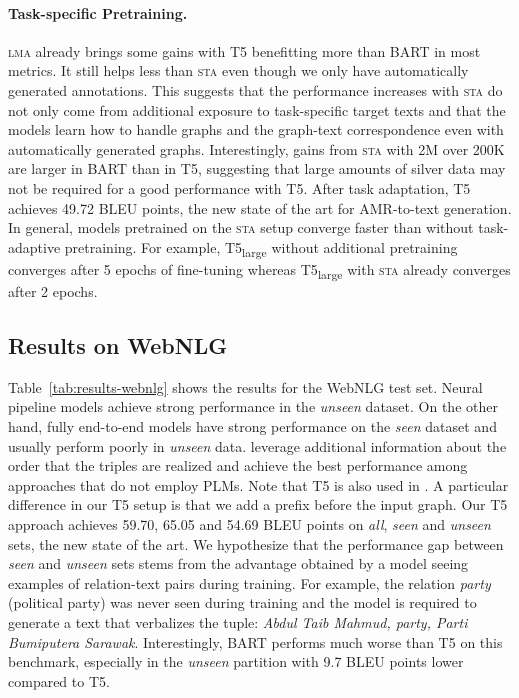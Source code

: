 \documentclass[11pt,a4paper]{article}
\begin{document}
\begin{table*}[t]
\paragraph{Task-specific Pretraining.}
\textsc{lma}
already brings some gains with T5 benefitting more than BART in most metrics.
It still helps less than \textsc{sta} even though we only have automatically generated annotations.
This suggests that the performance increases with \textsc{sta} do not only come from additional exposure to task-specific target texts and that the models learn how to handle graphs and the graph-text correspondence even with automatically generated graphs. Interestingly, gains from \textsc{sta} with 2M over 200K are larger in BART than in T5, suggesting that large amounts of silver data may not be required for a good performance with T5.
After task adaptation, T5 achieves 49.72 BLEU points, the new state of the art for AMR-to-text generation. In general, models pretrained on the \textsc{sta} setup converge faster than without task-adaptive pretraining. For example, T5\textsubscript{large} without additional pretraining converges after 5 epochs of fine-tuning whereas T5\textsubscript{large} with \textsc{sta} already converges after 2 epochs.



\subsection{Results on WebNLG}



Table~\ref{tab:results-webnlg} shows the results for the WebNLG test set. Neural pipeline models \cite{moryossef-etal-2019-step, castro-ferreira-etal-2019-neural} achieve strong performance in the \emph{unseen} dataset. On the other hand, fully end-to-end models \cite{ribeiro2020modeling,schmitt2020modeling} have strong performance on the \emph{seen} dataset and usually perform poorly in \textit{unseen} data. \citet{zhao-etal-2020-bridging} leverage additional information about the order that the triples are realized and achieve the best performance among approaches that do not employ PLMs. Note that T5 is also used in \citet{kale2020texttotext}. A particular difference in our T5 setup is that we add a prefix before the input graph. Our T5 approach achieves 59.70, 65.05 and 54.69 BLEU points on \emph{all}, \emph{seen} and \emph{unseen} sets, the new state of the art. We hypothesize that the performance gap between \emph{seen} and \emph{unseen} sets stems from the advantage obtained by a model seeing examples of relation-text pairs during training. For example, the relation \emph{party} (political party) was never seen during training and the model is required to generate a text that verbalizes the tuple: \emph{Abdul Taib Mahmud, party, Parti Bumiputera Sarawak}. Interestingly, BART performs much worse than T5 on this benchmark, especially in the \emph{unseen} partition with 9.7 BLEU points lower compared to T5.


\end{table*}
\end{document}

